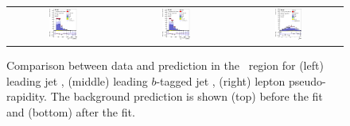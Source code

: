 \begin{figure}[tp]
\begin{tabular}{ccc}
  \includegraphics[width=0.27\textwidth]{Analysis/Figures_ttH/tesis_vars/postfit/jet1_pt_5jetex4btagin.eps} &
  \includegraphics[width=0.27\textwidth]{Analysis/Figures_ttH/tesis_vars/postfit/bjet1_pt_5jetex4btagin.eps} &
  \includegraphics[width=0.27\textwidth]{Analysis/Figures_ttH/tesis_vars/postfit/lep_eta_5jetex4btagin.eps} \\
\end{tabular}
\caption{Comparison between data and prediction in the \fivefour\ region for (left) leading jet \pt, (middle) leading $b$-tagged jet \pt, (right) lepton pseudo-rapidity. The background prediction is shown (top) before the fit and (bottom) after the fit.}
  \label{fig:vars2_fivefour}
\end{figure}
